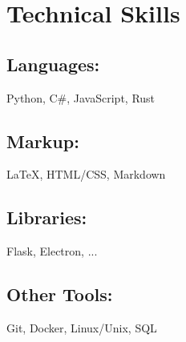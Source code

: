\section*{Technical Skills}

\subsection*{Languages:} Python, C\#, JavaScript, Rust
\subsection*{Markup:} {\LaTeX}, HTML/CSS, Markdown
\subsection*{Libraries:} Flask, Electron, ...
\subsection*{Other Tools:} Git, Docker, Linux/Unix, SQL
